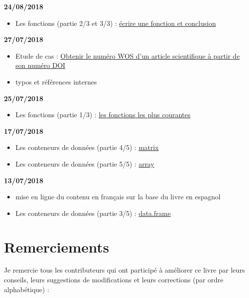 \documentclass[]{book}
\providecommand{\tightlist}{%
  \setlength{\itemsep}{0pt}\setlength{\parskip}{0pt}}
\theoremstyle{definition}
\theoremstyle{definition}
\theoremstyle{definition}
\theoremstyle{remark}
\begin{document}
\textbf{24/08/2018}

\begin{itemize}
\tightlist
\item
  Les fonctions (partie 2/3 et 3/3) :
  \protect\hyperlink{l015function}{écrire une fonction et conclusion}
\end{itemize}

\textbf{27/07/2018}

\begin{itemize}
\tightlist
\item
  Etude de cas : \protect\hyperlink{studyCase002}{Obtenir le numéro WOS
  d'un article scientifique à partir de son numéro DOI}
\item
  typos et références internes
\end{itemize}

\textbf{25/07/2018}

\begin{itemize}
\tightlist
\item
  Les fonctions (partie 1/3) : \protect\hyperlink{l015mainfun}{les
  fonctions les plus courantes}
\end{itemize}

\textbf{17/07/2018}

\begin{itemize}
\tightlist
\item
  Les conteneurs de données (partie 4/5) :
  \protect\hyperlink{l014matrix}{matrix}
\item
  Les conteneurs de données (partie 5/5) :
  \protect\hyperlink{l014array}{array}
\end{itemize}

\textbf{13/07/2018}

\begin{itemize}
\tightlist
\item
  mise en ligne du contenu en français sur la base du livre en espagnol
\item
  Les conteneurs de données (partie 3/5) :
  \protect\hyperlink{l014dataframe}{data.frame}
\end{itemize}

\chapter{Remerciements}\label{remerciements}

Je remercie tous les contributeurs qui ont participé à améliorer ce
livre par leurs conseils, leurs suggestions de modifications et leurs
corrections (par ordre alphabétique) :
\end{document}
